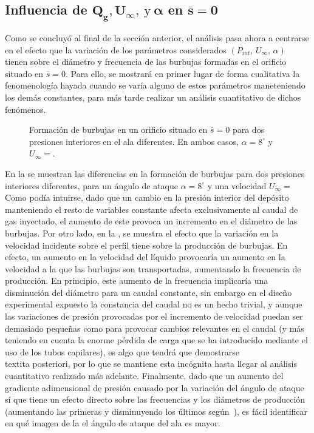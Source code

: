 \subsection{Influencia de $\mathbf{Q_{g}, U_{\infty},\ \mathrm{y}\ \alpha}$ en $\mathbf{\bar{s} = 0}$}

Como se concluyó al final de la sección anterior, el análisis pasa ahora a centrarse en el efecto que la variación de los parámetros considerados $\left(P_{int},\,U_{\infty},\,\alpha\right)$ tienen sobre el diámetro y frecuencia de las burbujas formadas en el orificio situado en $\bar{s} = 0$. Para ello, se mostrará en primer lugar de forma cualitativa la fenomenología hayada cuando se varía alguno de estos parámetros maneteniendo los demás constantes, para más tarde realizar un análisis cuantitativo de dichos fenómenos. 

\begin{figure}
\centering
{}\hspace{1mm}
\caption{Formación de burbujas en un orificio situado en $\bar{s} = 0$ para dos presiones interiores en el ala diferentes. En ambos casos, $\alpha = 8^{\circ}$ y $U_{\infty} = $.}
\end{figure}

En la  se muestran las diferencias en la formación de burbujas para dos presiones interiores diferentes, para un ángulo de ataque $\alpha = 8^{\circ}$ y una velocidad $U_{\infty} = $ %
Como podía intuirse, dado que un cambio en la presión interior del depósito manteniendo el resto de variables constante afecta exclusivamente al caudal de gas inyectado,  el aumento de este  provoca un incremento en el diámetro de las burbujas. Por otro lado, en la , se muestra el efecto que la variación en la velocidad incidente sobre el perfil tiene sobre la producción de burbujas. En efecto, un aumento en la velocidad del líquido provocaría un aumento en la velocidad a la que las burbujas son transportadas, aumentando la frecuencia de producción. En principio, este aumento de la frecuencia implicaría una disminución del diámetro para un caudal constante, sin embargo en el diseño experimental expuesto la constancia del caudal no es un hecho trivial, y aunque las variaciones de presión provocadas por el incremento de velocidad puedan ser demasiado pequeñas como para provocar cambios relevantes en el caudal (y más teniendo en cuenta la enorme pérdida de carga que se ha introducido mediante el uso de los tubos capilares), es algo que tendrá que demostrarse \\textit{a posteriori}, por lo que se mantiene esta incógnita hasta llegar al análisis cuantitativo realizado más adelante. Finalmente, dado que un aumento del gradiente adimensional de presión causado por la variación del ángulo de ataque sí que tiene un efecto directo sobre las frecuencias y los diámetros de producción (aumentando las primeras y disminuyendo los últimos según~\cite{Evangelio2015}), es fácil identificar en qué imagen  de  la  el ángulo de ataque del ala es mayor.


